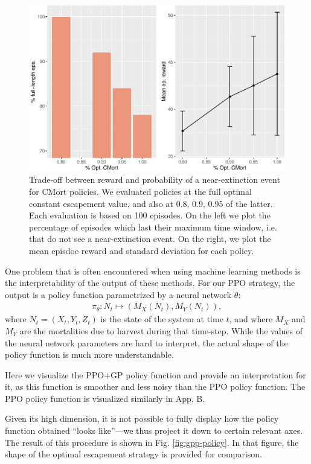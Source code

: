 \documentclass{article}
\begin{document}
\begin{figure}
\includegraphics[width=6in]{manuscript_files/figure-latex/fracmsy-1} \caption{Trade-off between reward and probability of a near-extinction event for CMort policies. We evaluated policies at the full optimal constant escapement value, and also at 0.8, 0.9, 0.95 of the latter. Each evaluation is based on 100 episodes. On the left we plot the percentage of episodes which last their maximum time window, i.e. that do not see a near-extinction event. On the right, we plot the mean episdoe reward and standard deviation for each policy.}\label{fig:fracmsy}
\end{figure}

One problem that is often encountered when using machine learning
methods is the interpretability of the output of these methods. For our
PPO strategy, the output is a policy function parametrized by a neural
network \(\theta\): \begin{align*}
  \pi_\theta: N_t \mapsto (M_X(N_t), M_Y(N_t)),
\end{align*} where \(N_t=(X_t,Y_t,Z_t)\) is the state of the system at
time \(t\), and where \(M_X\) and \(M_Y\) are the mortalities due to
harvest during that time-step. While the values of the neural network
parameters are hard to interpret, the actual shape of the policy
function is much more understandable.

Here we visualize the PPO+GP policy function and provide an
interpretation for it, as this function is smoother and less noisy than
the PPO policy function. The PPO policy function is visualized similarly
in App. B.

Given its high dimension, it is not possible to fully display how the
policy function obtained ``looks like''---we thus project it down to
certain relevant axes. The result of this procedure is shown in Fig.
\ref{fig:gpp-policy}. In that figure, the shape of the optimal
escapement strategy is provided for comparison.
\end{document}
